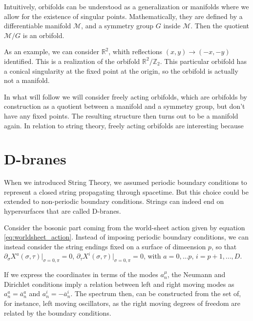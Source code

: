 
Intuitively, orbifolds can be understood as a generalization or manifolds where we allow for the existence of singular points. Mathematically, they are defined by a differentiable manifold $\mathcal{M}$, and a symmetry group $G$ inside $\mathcal{M}$. Then the quotient $\mathcal{M}/G$ is an orbifold.

As an example, we can consider $\mathbb{R}^2$, whith reflections $(x,y) \rightarrow (-x,-y)$ identified. This is a realization of the orbifold $\mathbb{R}^2/\mathbb{Z}_2$. This particular orbifold has a conical singularity at the fixed point at the origin, so the orbifold is actually not a manifold.

In what will follow we will consider freely acting orbifolds, which are orbifolds by construction as a quotient between a manifold and a symmetry group, but don't have any fixed points. The resulting structure then turns out to be a manifold again. In relation to string theory, freely acting orbifolds are interesting because %

\section{D-branes}
\label{sec:pre_branes}


When we introduced String Theory, we assumed periodic boundary conditions to represent a closed string propagating through spacetime. But this choice could be extended to non-periodic boundary conditions. Strings can indeed end on hypersurfaces that are called D-branes.

Consider the bosonic part coming from the world-sheet action given by equation \ref{eq:worldsheet_action}. Instead of imposing periodic boundary conditions, we can instead consider the string endings fixed on a surface of dimeension $p$, so that $\partial_\sigma X^a(\sigma,\tau)|_{\sigma = 0,\pi} = 0$, $\partial_\tau X^i(\sigma,\tau)|_{\sigma = 0,\pi} = 0$, with $a = 0,...p$, $i=p+1,...,D$.

If we express the coordinates in terms of the modes $a^\mu_n$, the Neumann and Dirichlet conditions imply a relation between left and right moving modes as $a^a_n = \overline{a}^a_n$ and $a^i_n = -\overline{a}^i_n$. The spectrum then, can be constructed from the set of, for instance, left moving oscillators, as the right moving degrees of freedom are related by the boundary conditions.

